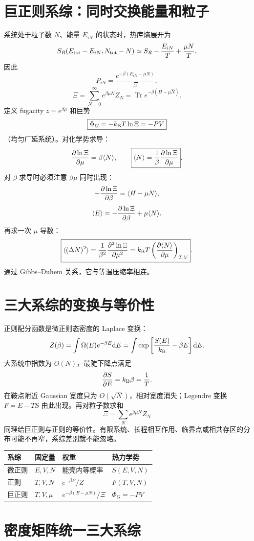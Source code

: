 \section{巨正则系综：同时交换能量和粒子}
系统处于粒子数 $N$、能量 $E_{iN}$ 的状态时，热库熵展开为
\[
S_R(E_{\rm tot}-E_{iN},N_{\rm tot}-N)
\simeq S_R-\frac{E_{iN}}T+\frac{\mu N}T.
\]
因此
\[
\boxed{
P_{iN}=\frac{e^{-\beta(E_{iN}-\mu N)}}{\Xi}},
\]
\[
\Xi=\sum_{N=0}^{\infty}e^{\beta\mu N}Z_N
=\operatorname{Tr}e^{-\beta(H-\mu\hat N)}.
\]
定义 fugacity $z=e^{\beta\mu}$ 和巨势
\[
\boxed{\Phi_G=-k_{\mathrm B} T\ln\Xi=-PV}
\]
（均匀广延系统）。对化学势求导：
\[
\frac{\partial \ln\Xi}{\partial \mu}=\beta\langle N\rangle,
\qquad
\boxed{\langle N\rangle=\frac1\beta\frac{\partial \ln\Xi}{\partial \mu}}.
\]
对 $\beta$ 求导时必须注意 $\beta\mu$ 同时出现：
\[
-\frac{\partial \ln\Xi}{\partial \beta}
=\langle H-\mu N\rangle,
\]
\[
\langle E\rangle=-\frac{\partial \ln\Xi}{\partial \beta}
+\mu\langle N\rangle.
\]
再求一次 $\mu$ 导数：
\[
\boxed{
\langle(\Delta N)^2\rangle
=\frac1{\beta^2}\frac{\partial^2\ln\Xi}{\partial\mu^2}
=k_{\mathrm B} T\left(\frac{\partial \langle N\rangle}{\partial \mu}\right)_{T,V}}.
\]
通过 Gibbs--Duhem 关系，它与等温压缩率相连。

\section{三大系综的变换与等价性}
正则配分函数是微正则态密度的 Laplace 变换：
\[
Z(\beta)=\int\Omega(E)e^{-\beta E}\mathrm d E
=\int\exp\left[\frac{S(E)}{k_{\mathrm B}}-\beta E\right]\mathrm d E.
\]
大系统中指数为 $O(N)$，最陡下降点满足
\[
\frac{\partial S}{\partial E}=k_{\mathrm B}\beta=\frac1T.
\]
在鞍点附近 Gaussian 宽度只为 $O(\sqrt N)$，相对宽度消失；Legendre 变换
$F=E-TS$ 由此出现。再对粒子数求和
\[
\Xi=\sum_Ne^{\beta\mu N}Z_N
\]
同理给巨正则与正则的等价性。有限系统、长程相互作用、临界点或相共存区的分布可能不再窄，系综差别就不能忽略。

\begin{center}
\begin{tabular}{llll}
\toprule
系综&固定量&权重&热力学势\\
\midrule
微正则&$E,V,N$&能壳内等概率&$S(E,V,N)$\\
正则&$T,V,N$&$e^{-\beta E}/Z$&$F(T,V,N)$\\
巨正则&$T,V,\mu$&$e^{-\beta(E-\mu N)}/\Xi$&$\Phi_G=-PV$\\
\bottomrule
\end{tabular}
\end{center}

\section{密度矩阵统一三大系综}
